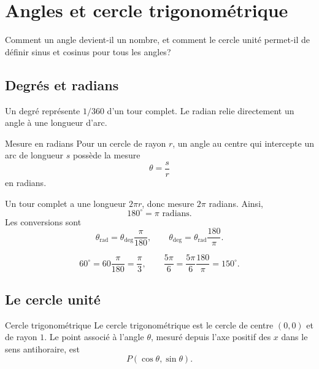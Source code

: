 \chapter{Angles et cercle trigonométrique}
\label{manual:chapter:14}

\begin{questionbox}
Comment un angle devient-il un nombre, et comment le cercle unité permet-il de définir sinus et cosinus pour tous les angles?
\end{questionbox}

\section{Degrés et radians}
\label{manual:section:14.01}

Un degré représente $1/360$ d'un tour complet. Le radian relie directement un angle à une longueur d'arc.

\begin{definition}{Mesure en radians}{}
Pour un cercle de rayon $r$, un angle au centre qui intercepte un arc de longueur $s$ possède la mesure
\[
\theta=\frac sr
\]
en radians.
\end{definition}

Un tour complet a une longueur $2\pi r$, donc mesure $2\pi$ radians. Ainsi,
\[
180^\circ=\pi\text{ radians}.
\]
Les conversions sont
\[
\theta_{\mathrm{rad}}=\theta_{\mathrm{deg}}\frac{\pi}{180},
\qquad
\theta_{\mathrm{deg}}=\theta_{\mathrm{rad}}\frac{180}{\pi}.
\]

\begin{examplebox}
\[
60^\circ=60\frac{\pi}{180}=\frac\pi3,
\qquad
\frac{5\pi}{6}=\frac{5\pi}{6}\frac{180}{\pi}=150^\circ.
\]
\end{examplebox}

\section{Le cercle unité}
\label{manual:section:14.02}

\begin{definition}{Cercle trigonométrique}{}
Le cercle trigonométrique est le cercle de centre $(0,0)$ et de rayon $1$. Le point associé à l'angle $\theta$, mesuré depuis l'axe positif des $x$ dans le sens antihoraire, est
\[
P(\cos\theta,\sin\theta).
\]
\end{definition}

